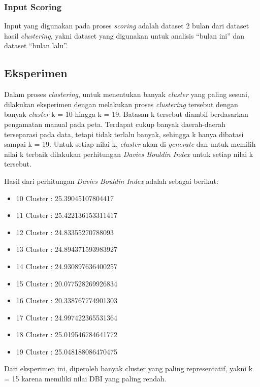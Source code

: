 \documentclass{article}
\begin{document}
\subsubsection{Input Scoring}

\begin{adjustwidth}{4em}{0pt}
	
	\hspace{\parindent}Input yang digunakan pada proses \textit{scoring} adalah dataset 2 bulan dari dataset hasil \textit{clustering}, yakni dataset yang digunakan untuk analisis ``bulan ini'' dan dataset ``bulan lalu''.
	
	
\end{adjustwidth}

\subsection{Eksperimen}

\begin{adjustwidth}{2em}{0pt}
	
\hspace{\parindent}Dalam proses \textit{clustering}, untuk menentukan banyak \textit{cluster} yang paling sesuai, dilakukan eksperimen dengan melakukan proses \textit{clustering} tersebut dengan banyak \textit{cluster} k = 10 hingga k = 19. Batasan k tersebut diambil berdasarkan pengamatan manual pada peta. Terdapat cukup banyak daerah-daerah terseparasi pada data, tetapi tidak terlalu banyak, sehingga k hanya dibatasi sampai k = 19. Untuk setiap nilai k, \textit{cluster} akan di-\textit{generate} dan untuk memilih nilai k terbaik dilakukan perhitungan \textit{Davies Bouldin Index} untuk setiap nilai k tersebut.

Hasil dari perhitungan \textit{Davies Bouldin Index} adalah sebagai berikut: 

\begin{itemize}
	\item{10 Cluster : 25.39045107804417}
	\item{11 Cluster : 25.422136153311417}
	\item{12 Cluster : 24.83355270788093}
	\item{13 Cluster : 24.894371593983927}
	\item{14 Cluster : 24.930897636400257}
	\item{15 Cluster : 20.077528269926834}
	\item{16 Cluster : 20.338767774901303}
	\item{17 Cluster : 24.997422365531364}
	\item{18 Cluster : 25.019546784641772}
	\item{19 Cluster : 25.048188086470475}	
\end{itemize}

Dari eksperimen ini, diperoleh banyak cluster yang paling representatif, yakni k = 15 karena memiliki nilai DBI yang paling rendah.

\end{adjustwidth}
\end{document}

